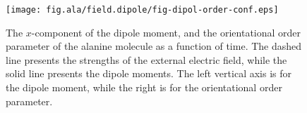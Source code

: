 \documentclass[a4paper,preprint,unsortedaddress,onecolumn]{revtex4-1}
\begin{document}



\begin{figure}
  \centering
  \texttt{[image: fig.ala/field.dipole/fig-dipol-order-conf.eps]}
  \caption{The
    $x$-component of the dipole moment, and the orientational order parameter
    of the alanine molecule as a
    function of time. The dashed line presents the strengths of the
    external electric field, while the solid line presents the dipole
    moments. The left vertical axis is for the dipole moment, while
    the right is for the orientational order parameter.
  }
  \label{fig:tmp3}
\end{figure}
\end{document}
